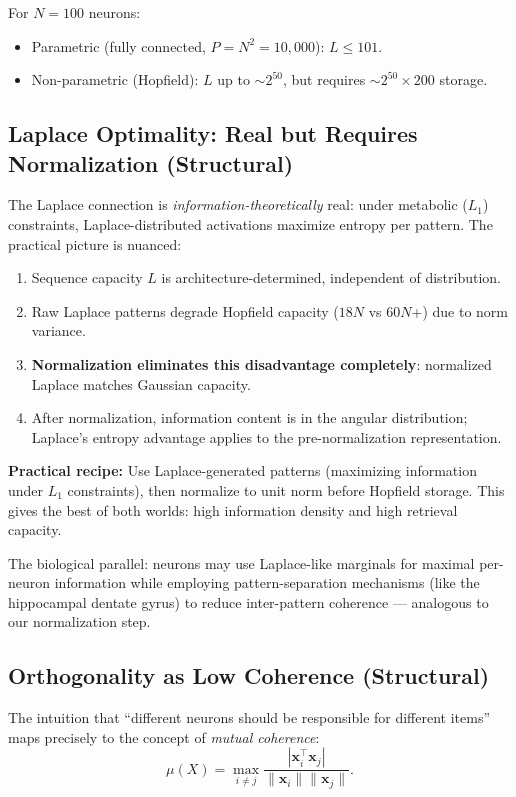 \documentclass[11pt]{article}
\theoremstyle{definition}
\theoremstyle{remark}
\begin{document}
For $N = 100$ neurons:
\begin{itemize}
    \item Parametric (fully connected, $P = N^2 = 10{,}000$): $L \leq 101$.
    \item Non-parametric (Hopfield): $L$ up to $\sim 2^{50}$, but requires $\sim 2^{50} \times 200$ storage.
\end{itemize}

\subsection{Laplace Optimality: Real but Requires Normalization (Structural)}

The Laplace connection is \emph{information-theoretically} real: under metabolic ($L_1$) constraints, Laplace-distributed activations maximize entropy per pattern. The practical picture is nuanced:

\begin{enumerate}
    \item Sequence capacity $L$ is architecture-determined, independent of distribution.
    \item Raw Laplace patterns degrade Hopfield capacity ($18N$ vs $60N$+) due to norm variance.
    \item \textbf{Normalization eliminates this disadvantage completely}: normalized Laplace matches Gaussian capacity.
    \item After normalization, information content is in the angular distribution; Laplace's entropy advantage applies to the pre-normalization representation.
\end{enumerate}

\textbf{Practical recipe:} Use Laplace-generated patterns (maximizing information under $L_1$ constraints), then normalize to unit norm before Hopfield storage. This gives the best of both worlds: high information density and high retrieval capacity.

The biological parallel: neurons may use Laplace-like marginals for maximal per-neuron information while employing pattern-separation mechanisms (like the hippocampal dentate gyrus) to reduce inter-pattern coherence --- analogous to our normalization step.

\subsection{Orthogonality as Low Coherence (Structural)}

The intuition that ``different neurons should be responsible for different items'' maps precisely to the concept of \emph{mutual coherence}:
\[
    \mu(X) = \max_{i \neq j} \frac{|\mathbf{x}_i^\top \mathbf{x}_j|}{\|\mathbf{x}_i\| \|\mathbf{x}_j\|}.
\]
\end{document}
